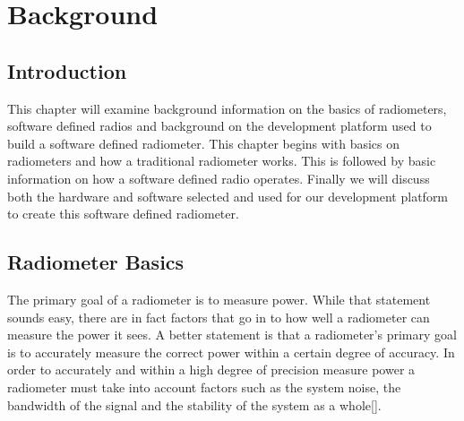 

\chapter{Background}
\section{Introduction}
This chapter will examine background information on the basics of radiometers, software defined radios and background on the development platform used to build a software defined radiometer.  This chapter begins with basics on radiometers and how a traditional radiometer works.  This is followed by basic information on how a software defined radio operates.  Finally we will discuss both the hardware and software selected and used for our development platform to create this software defined radiometer.

\section{Radiometer Basics}

The primary goal of a radiometer is to measure power.  While that statement sounds easy, there are in fact factors that go in to how well a radiometer can measure the power it sees.  A better statement is that a radiometer's primary goal is to accurately measure the correct power within a certain degree of accuracy.  In order to accurately and within a high degree of precision measure power a radiometer must take into account factors such as the system noise, the bandwidth of the signal and the stability of the system as a whole[\cite{Evans}].  

